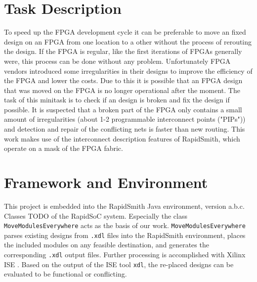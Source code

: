 \section{Task Description}
\label{sec:taskdescription}
To speed up the FPGA development cycle it can be preferable to move an fixed design on an FPGA from one location to a other without the process of rerouting the design. If the FPGA is regular, like the first iterations of FPGAs generally were, this process can be done without any problem. Unfortunately FPGA vendors introduced some irregularities in their designs to improve the efficiency of the FPGA and lower the costs. 
Due to this it is possible that an FPGA design that was moved on the FPGA is no longer operational after the moment.
The task of this minitask is to check if an design is broken and fix the design if possible.
It is suspected that a broken part of the FPGA only contains a small amount of irregularities (about 1-2 programmable interconnect points ("PIPs")) and detection and repair of the conflicting nets is faster than new routing. This work makes use of the interconnect description features of RapidSmith, which operate on a mask of the FPGA fabric.

\section{Framework and Environment}
\label{sec:frameworkandenvironment}

This project is embedded into the RapidSmith Java environment, version a.b.c. Classes TODO of the RapidSoC system. Especially the class \texttt{MoveModulesEverywhere} acts as the basis of our work. \texttt{MoveModulesEverywhere} parses existing designs from \texttt{.xdl} files into the RapidSmith environment, places the included modules on any feasible destination, and generates the corresponding \texttt{.xdl} output files. Further processing is accomplished with Xilinx ISE \cite{ise}. Based on the output of the ISE tool \texttt{xdl}, the re-placed designs can be evaluated to be functional or conflicting.

